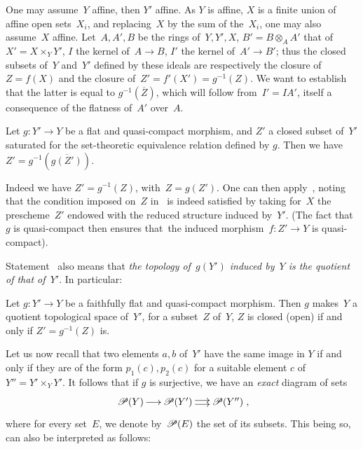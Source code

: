 One may assume~$Y$ affine, then $Y'$ affine. As $Y$ is affine,
$X$ is a finite
union of affine open sets~$X_{i}$, and replacing~$X$ by the sum
of the~$X_{i}$, one may also assume~$X$
affine. Let~$A,A',B$ be the rings of~$Y,Y',X$, $B'=B\otimes_{A}A'$
that of~$X'=X\times_{Y}Y'$, $I$ the kernel of~$A\to B$, $I'$ the
kernel of~$A'\to B'$; thus the closed subsets of~$Y$ and~$Y'$
defined by these ideals are respectively the closure
of~$Z=f(X)$ and the closure of~$Z'=f'(X')=g^{-1}(Z)$. We want to
establish that the latter is equal to
$g^{-1}(\overline{Z})$, which will follow from~$I'=IA'$, itself a
consequence of the flatness of~$A'$ over~$A$.

\begin{corollary}
\label{VIII.4.2}
Let $g\colon Y'\to Y$ be a flat and quasi-compact morphism, and $Z'$
a closed subset of~$Y'$ saturated for the set-theoretic equivalence
relation defined by $g$. Then we have
$Z'=g^{-1}(\overline{g(Z')})$.
\end{corollary}

Indeed we have $Z'=g^{-1}(Z)$, with~$Z=g(Z')$. One can then
apply~, noting that the condition imposed on~$Z$
in~ is indeed satisfied by taking for~$X$ the
prescheme~$Z'$ endowed with the reduced structure induced
by~$Y'$. (The fact that~$g$ is quasi-compact then ensures that~the
induced morphism~$f\colon Z'\to Y$ is quasi-compact).

Statement~ also means that \emph{the topology
of~$g(Y')$ induced by~$Y$ is the quotient of that of~$Y'$}. In
particular:

\begin{corollary}
\label{VIII.4.3}
Let $g\colon Y'\to Y$ be a faithfully flat and quasi-compact
morphism. Then $g$ makes~$Y$ a quotient topological space
of~$Y'$, \ie for a subset~$Z$ of~$Y$, $Z$ is closed
(\resp open) if and only if $Z'=g^{-1}(Z)$ is.
\end{corollary}

Let us now recall that two elements $a,b$ of~$Y'$ have the same
image in $Y$ if and only if they are of the form
$p_{1}(c),p_{2}(c)$ for a suitable element $c$
of~$Y''=Y'\times_{Y}Y'$. It follows that if $g$ is surjective,
we have an \emph{exact} diagram of sets
$$
\xymatrix@C=.5cm{\cal{P}(Y)\ar[r] & \cal{P}(Y')\ar@<2pt>[r]\ar@<-2pt>[r] &
\cal{P}(Y'')}\quoi,
$$
where for every set~$E$, we denote by~$\cal{P}(E)$ the set of its
subsets. This being so,  can also be interpreted as
follows:

